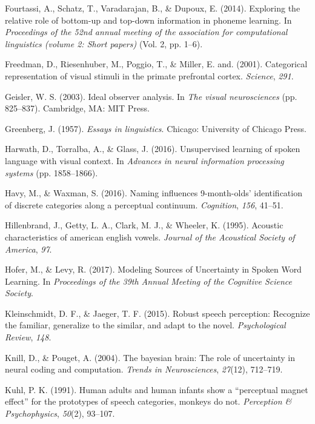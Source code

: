 \documentclass[english,,man,floatsintext]{apa6}
\theoremstyle{definition}
\theoremstyle{definition}
\theoremstyle{definition}
\theoremstyle{remark}
\begin{document}
\hypertarget{ref-fourtassi2014b}{}
Fourtassi, A., Schatz, T., Varadarajan, B., \& Dupoux, E. (2014).
Exploring the relative role of bottom-up and top-down information in
phoneme learning. In \emph{Proceedings of the 52nd annual meeting of the
association for computational linguistics (volume 2: Short papers)}
(Vol. 2, pp. 1--6).

\hypertarget{ref-freedman2001}{}
Freedman, D., Riesenhuber, M., Poggio, T., \& Miller, E. and. (2001).
Categorical representation of visual stimuli in the primate prefrontal
cortex. \emph{Science}, \emph{291}.

\hypertarget{ref-Geisler2003}{}
Geisler, W. S. (2003). Ideal observer analysis. In \emph{The visual
neurosciences} (pp. 825--837). Cambridge, MA: MIT Press.

\hypertarget{ref-greenberg1957}{}
Greenberg, J. (1957). \emph{Essays in linguistics}. Chicago: University
of Chicago Press.

\hypertarget{ref-harwath2016}{}
Harwath, D., Torralba, A., \& Glass, J. (2016). Unsupervised learning of
spoken language with visual context. In \emph{Advances in neural
information processing systems} (pp. 1858--1866).

\hypertarget{ref-havy2016}{}
Havy, M., \& Waxman, S. (2016). Naming influences 9-month-olds'
identification of discrete categories along a perceptual continuum.
\emph{Cognition}, \emph{156}, 41--51.

\hypertarget{ref-hillenbrand1995}{}
Hillenbrand, J., Getty, L. A., Clark, M. J., \& Wheeler, K. (1995).
Acoustic characteristics of american english vowels. \emph{Journal of
the Acoustical Society of America}, \emph{97}.

\hypertarget{ref-hofer2017}{}
Hofer, M., \& Levy, R. (2017). Modeling Sources of Uncertainty in Spoken
Word Learning. In \emph{Proceedings of the 39th Annual Meeting of the
Cognitive Science Society}.

\hypertarget{ref-kleinschmidt2015}{}
Kleinschmidt, D. F., \& Jaeger, T. F. (2015). Robust speech perception:
Recognize the familiar, generalize to the similar, and adapt to the
novel. \emph{Psychological Review}, \emph{148}.

\hypertarget{ref-Knill04}{}
Knill, D., \& Pouget, A. (2004). The bayesian brain: The role of
uncertainty in neural coding and computation. \emph{Trends in
Neurosciences}, \emph{27}(12), 712--719.

\hypertarget{ref-kuhl1991}{}
Kuhl, P. K. (1991). Human adults and human infants show a ``perceptual
magnet effect'' for the prototypes of speech categories, monkeys do not.
\emph{Perception \& Psychophysics}, \emph{50}(2), 93--107.
\end{document}
